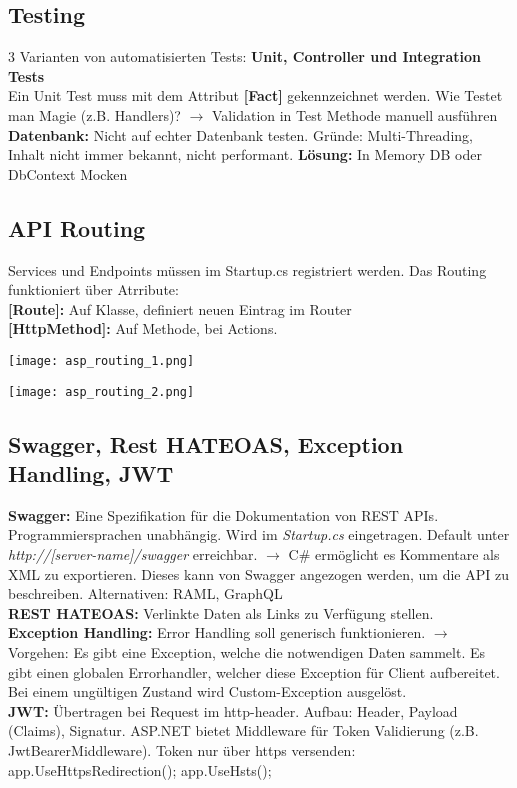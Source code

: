\subsection{Testing}
3 Varianten von automatisierten Tests: \textbf{Unit, Controller und Integration Tests}\\
Ein Unit Test muss mit dem Attribut \textbf{[Fact]} gekennzeichnet werden. Wie Testet man Magie (z.B. Handlers)? $\rightarrow$ Validation in Test Methode manuell ausführen\\
\textcolor{b}{\textbf{Datenbank:}} Nicht auf echter Datenbank testen. Gründe: Multi-Threading, Inhalt nicht immer bekannt, nicht performant. \textbf{Lösung:} In Memory DB oder DbContext Mocken
\subsection{API Routing}
Services und Endpoints müssen im Startup.cs registriert werden. Das Routing funktioniert über Atrribute:\\
\textbf{[Route]:} Auf Klasse, definiert neuen Eintrag im Router\\
\textbf{[HttpMethod]:} Auf Methode, bei Actions.\\
\begin{minipage}{0.5\linewidth}
  \texttt{[image: asp\_routing\_1.png]}
\end{minipage}
\begin{minipage}{0.5\linewidth}
  \texttt{[image: asp\_routing\_2.png]}
\end{minipage}
\subsection{Swagger, Rest HATEOAS, Exception Handling, JWT}
\textcolor{b}{\textbf{Swagger:}} Eine Spezifikation für die Dokumentation von REST APIs. Programmiersprachen unabhängig. Wird im \textit{Startup.cs} eingetragen. Default unter \textit{http://[server-name]/swagger} erreichbar. $\rightarrow$ C\# ermöglicht es Kommentare als XML zu exportieren. Dieses kann von Swagger angezogen werden, um die API zu beschreiben. Alternativen: RAML, GraphQL\\
\textcolor{b}{\textbf{REST HATEOAS:}} Verlinkte Daten als Links zu Verfügung stellen.\\
\textcolor{b}{\textbf{Exception Handling:}} Error Handling soll generisch funktionieren. $\rightarrow$ Vorgehen: Es gibt eine Exception, welche die notwendigen Daten sammelt. Es gibt einen globalen Errorhandler, welcher diese Exception für Client aufbereitet. Bei einem ungültigen Zustand wird Custom-Exception ausgelöst.\\
\textcolor{b}{\textbf{JWT:}} Übertragen bei Request im http-header. Aufbau: Header, Payload (Claims), Signatur. ASP.NET bietet Middleware für Token Validierung (z.B. JwtBearerMiddleware). Token nur über https versenden: app.UseHttpsRedirection(); app.UseHsts();
